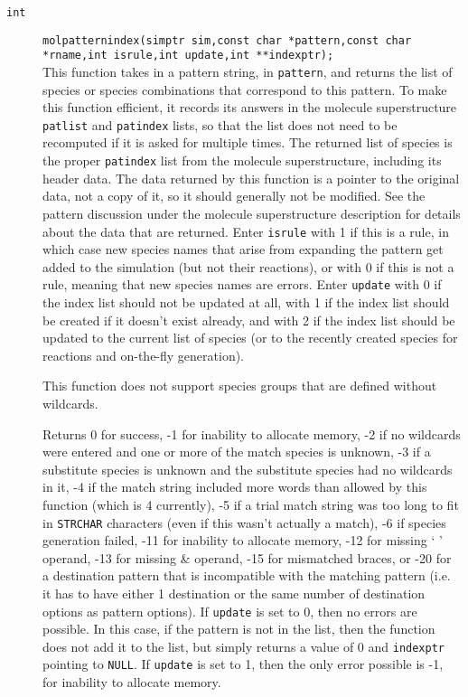 \documentclass {book}
\begin{document}
\begin{description}
\item[\texttt{int}]
\texttt{molpatternindex(simptr sim,const char *pattern,const char *rname,int isrule,int update,int **indexptr);} \\
This function takes in a pattern string, in \texttt{pattern}, and returns the list of species or species combinations that correspond to this pattern. To make this function efficient, it records its answers in the molecule superstructure \texttt{patlist} and \texttt{patindex} lists, so that the list does not need to be recomputed if it is asked for multiple times. The returned list of species is the proper \texttt{patindex} list from the molecule superstructure, including its header data. The data returned by this function is a pointer to the original data, not a copy of it, so it should generally not be modified. See the pattern discussion under the molecule superstructure description for details about the data that are returned. Enter \texttt{isrule} with 1 if this is a rule, in which case new species names that arise from expanding the pattern get added to the simulation (but not their reactions), or with 0 if this is not a rule, meaning that new species names are errors. Enter \texttt{update} with 0 if the index list should not be updated at all, with 1 if the index list should be created if it doesn't exist already, and with 2 if the index list should be updated to the current list of species (or to the recently created species for reactions and on-the-fly generation).

This function does not support species groups that are defined without wildcards.

Returns 0 for success, -1 for inability to allocate memory, -2 if no wildcards were entered and one or more of the match species is unknown, -3 if a substitute species is unknown and the substitute species had no wildcards in it, -4 if the match string included more words than allowed by this function (which is 4 currently), -5 if a trial match string was too long to fit in \texttt{STRCHAR} characters (even if this wasn't actually a match), -6 if species generation failed, -11 for inability to allocate memory, -12 for missing ` ' operand, -13 for missing \& operand, -15 for mismatched braces, or -20 for a destination pattern that is incompatible with the matching pattern (i.e. it has to have either 1 destination or the same number of destination options as pattern options). If \texttt{update} is set to 0, then no errors are possible. In this case, if the pattern is not in the list, then the function does not add it to the list, but simply returns a value of 0 and \texttt{indexptr} pointing to \texttt{NULL}. If \texttt{update} is set to 1, then the only error possible is -1, for inability to allocate memory.


\end{description}
\end{document}
